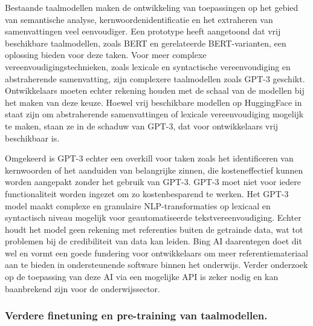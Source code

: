 Bestaande taalmodellen maken de ontwikkeling van toepassingen op het gebied van semantische analyse, kernwoordenidentificatie en het extraheren van samenvattingen veel eenvoudiger. Een prototype heeft aangetoond dat vrij beschikbare taalmodellen, zoals BERT en gerelateerde BERT-varianten, een oplossing bieden voor deze taken. Voor meer complexe vereenvoudigingstechnieken, zoals lexicale en syntactische vereenvoudiging en abstraherende samenvatting, zijn complexere taalmodellen zoals GPT-3 geschikt. Ontwikkelaars moeten echter rekening houden met de schaal van de modellen bij het maken van deze keuze. Hoewel vrij beschikbare modellen op HuggingFace in staat zijn om abstraherende samenvattingen of lexicale vereenvoudiging mogelijk te maken, staan ze in de schaduw van GPT-3, dat voor ontwikkelaars vrij beschikbaar is. 

\medskip

Omgekeerd is GPT-3 echter een overkill voor taken zoals het identificeren van kernwoorden of het aanduiden van belangrijke zinnen, die kosteneffectief kunnen worden aangepakt zonder het gebruik van GPT-3. GPT-3 moet niet voor iedere functionaliteit worden ingezet om zo kostenbesparend te werken. Het GPT-3 model maakt complexe en granulaire NLP-transformaties op lexicaal en syntactisch niveau mogelijk voor geautomatiseerde tekstvereenvoudiging. Echter houdt het model geen rekening met referenties buiten de getrainde data, wat tot problemen bij de credibiliteit van data kan leiden. Bing AI daarentegen doet dit wel en vormt een goede fundering voor ontwikkelaars om meer referentiemateriaal aan te bieden in ondersteunende software binnen het onderwijs. Verder onderzoek op de toepassing van deze AI via een mogelijke API is zeker nodig en kan baanbrekend zijn voor de onderwijssector. 

\subsubsection{Verdere finetuning en pre-training van taalmodellen.}

